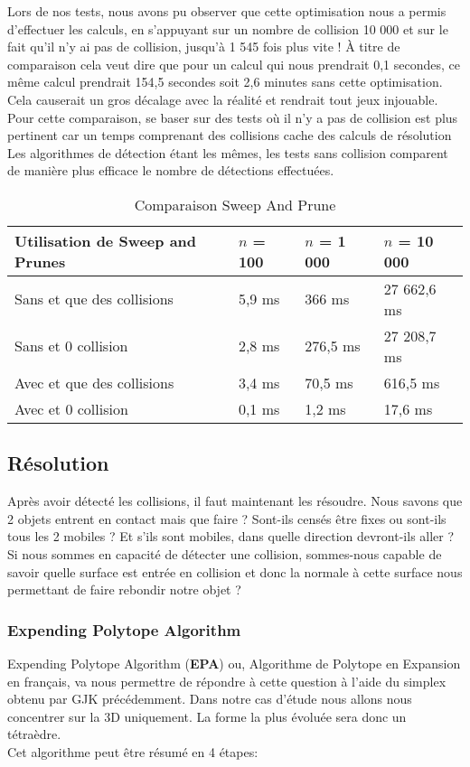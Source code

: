 Lors de nos tests, nous avons pu observer que cette optimisation nous a permis d'effectuer les calculs, en s'appuyant sur un nombre de collision 10 000 et sur le fait qu'il n'y ai pas de collision, jusqu'à 1 545 fois plus vite ! À titre de comparaison cela veut dire que pour un calcul qui nous prendrait 0,1 secondes, ce même calcul prendrait 154,5 secondes soit 2,6 minutes sans cette optimisation. Cela causerait un gros décalage avec la réalité et rendrait tout jeux injouable.\\
Pour cette comparaison, se baser sur des tests où il n'y a pas de collision est plus pertinent car un temps comprenant des collisions cache des calculs de résolution Les algorithmes de détection étant les mêmes, les tests sans collision comparent de manière plus efficace le nombre de détections effectuées.


\begin{table}[H]
	\centering
	\begin{tabular}{|l|l|l|l|}
		\hline
		Utilisation de Sweep and Prunes & $n$ = 100	& $n$ = 1 000 & $n$ = 10 000\\ \hline
		Sans et que des collisions & 5,9 ms & 366 ms & 27 662,6 ms\\
		Sans et 0 collision & 2,8 ms & 276,5 ms & 27 208,7 ms\\
		Avec et que des collisions & 3,4 ms	& 70,5 ms & 616,5 ms\\
		Avec et 0 collision & 0,1 ms	& 1,2 ms & 17,6 ms\\
		\hline
	\end{tabular}
	\caption{Comparaison Sweep And Prune}
	\label{tab:tabOptimisation}
\end{table}


\newpage

\subsection{Résolution}
Après avoir détecté les collisions, il faut maintenant les résoudre. Nous savons que 2 objets entrent en contact mais que faire ? Sont-ils censés être fixes ou sont-ils tous les 2 mobiles ? Et s'ils sont mobiles, dans quelle direction devront-ils aller ? Si nous sommes en capacité de détecter une collision, sommes-nous capable de savoir quelle surface est entrée en collision et donc la normale à cette surface nous permettant de faire \og rebondir \fg notre objet ?\\

\subsubsection{Expending Polytope Algorithm}
Expending Polytope Algorithm (\textbf{EPA}) \citep{EPA} ou, Algorithme de Polytope en Expansion en français, va nous permettre de répondre à cette question à l'aide du simplex obtenu par GJK précédemment. Dans notre cas d'étude nous allons nous concentrer sur la 3D uniquement. La forme la plus évoluée sera donc un tétraèdre.\\
Cet algorithme peut être résumé en 4 étapes:

